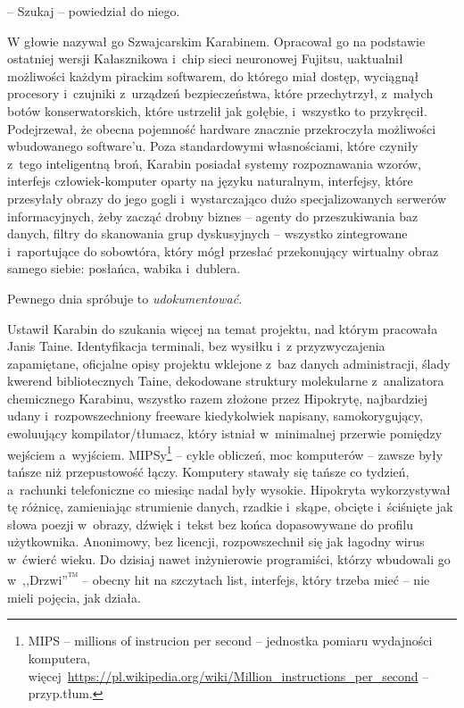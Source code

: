 \documentclass[oneside,polish,11pt,sfheadings]{mwbk}
\begin{document}
-- Szukaj -- powiedział do niego.

W głowie nazywał go Szwajcarskim Karabinem. Opracował go na podstawie
ostatniej wersji Kałasznikowa i~chip sieci neuronowej Fujitsu,
uaktualnił możliwości każdym pirackim softwarem, do którego miał dostęp,
wyciągnął procesory i~czujniki z~urządzeń bezpieczeństwa, które
przechytrzył, z~małych botów konserwatorskich, które ustrzelił jak
gołębie, i~wszystko to przykręcił. Podejrzewał, że obecna pojemność
hardware znacznie przekroczyła możliwości wbudowanego software'u. Poza
standardowymi własnościami, które czyniły z~tego inteligentną broń,
Karabin posiadał systemy rozpoznawania wzorów, interfejs
człowiek-komputer oparty na języku naturalnym, interfejsy, które
przesyłały obrazy do jego gogli i~wystarczająco dużo specjalizowanych
serwerów informacyjnych, żeby zacząć drobny biznes -- agenty do
przeszukiwania baz danych, filtry do skanowania grup dyskusyjnych -- wszystko zintegrowane i~raportujące do sobowtóra, który mógł przesłać
przekonujący wirtualny obraz samego siebie: posłańca, wabika i~dublera.

Pewnego dnia spróbuje to \emph{udokumentować}.

Ustawił Karabin do szukania więcej na temat projektu, nad którym
pracowała Janis Taine. Identyfikacja terminali, bez wysiłku i~z przyzwyczajenia zapamiętane, oficjalne opisy projektu wklejone z~baz
danych administracji, ślady kwerend bibliotecznych Taine, dekodowane
struktury molekularne z~analizatora chemicznego Karabinu, wszystko razem
złożone przez Hipokrytę, najbardziej udany i~rozpowszechniony freeware
kiedykolwiek napisany, samokorygujący, ewoluujący kompilator/tłumacz,
który istniał w~minimalnej przerwie pomiędzy wejściem a~wyjściem. MIPSy\footnote{MIPS -- millions of instrucion per second -- jednostka pomiaru
wydajności komputera,
więcej~\url{https://pl.wikipedia.org/wiki/Million\_instructions\_per\_second}
-- przyp.tłum.} -- cykle obliczeń, moc komputerów -- zawsze były tańsze niż przepustowość
łączy. Komputery stawały się tańsze co tydzień, a~rachunki
telefoniczne co miesiąc nadal były wysokie. Hipokryta wykorzystywał tę
różnicę, zamieniając strumienie danych, rzadkie i~skąpe, obcięte i~ściśnięte jak słowa poezji w~obrazy, dźwięk i~tekst bez końca
dopasowywane do profilu użytkownika. Anonimowy, bez licencji,
rozpowszechnił się jak łagodny wirus w~ćwierć wieku. Do dzisiaj nawet
inżynierowie programiści, którzy wbudowali go w~,,Drzwi''\textsuperscript{™} -- obecny hit na szczytach list, interfejs,
który trzeba mieć -- nie mieli pojęcia, jak działa.
\end{document}

